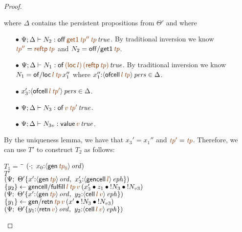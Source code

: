\begin{proof}
\begin{description}
where $\Delta$ contains the persistent propositions from $\Theta'$ and where
\begin{itemize}
\item[$\bullet$] $\Psi; \Delta \vdash N_2 : \isconc{{\sf off}\,\lf{{\sf get1}}\,\lf{{\it tp}''}\,\lf{{\it tp}}}$. By traditional inversion we know $\lf{{\it tp}''} = \lf{{\sf reftp}\,{\it tp}}$ and $N_2 = {{\sf off/get1}\,\lf{\it tp}}$. 
\item[$\bullet$] $\Psi; \Delta \vdash N_1 : \isconc{{\sf of}\,\lf{({\sf loc}\,l)}\,\lf{({\sf reftp}\,\lf{{\it tp}})}}$. By traditional inversion we know $N_1 = {\sf of/loc}\,\lf{l}\,\lf{{\it tp}}\,x_1''$ where $x_1''{:}\ispers{\susp{{\sf ofcell}\,\lf{l}\,\lf{{\it tp}}}} \in \Delta$.
\item[$\bullet$] $x_3'{:}\ispers{\susp{{\sf ofcell}\,\lf{l}\,\lf{{\it tp}'}}} \in \Delta$.
\item[$\bullet$] $\Psi; \Delta \vdash N_3 : \isconc{{\sf of}\,\lf{v}\,\lf{{\it tp}'}}$.
\item[$\bullet$] $\Psi; \Delta \vdash N_{3v} : \isconc{{\sf value}\,\lf{v}}$.
\end{itemize}
By the uniqueness lemma, we have that $x_3' = x_1''$ and $\lf{{\it
    tp}'} = \lf{{\it tp}}$. Therefore, we can use $T'$ to construct $T_2$
as follows:

\begin{tabbing}
$T_1 = ~$ \= \qquad \= 
    $(\cdot; ~ x_0{:}\istrue{\susp{{\sf gen}\,\lf{{\it tp}_0}}})$
\\
\>$T'$
\\
\>\> $\left(\Psi; ~
       \tackon{\Theta'}
       {x'{:}\istrue{\susp{{\sf gen}\,\lf{{\it tp}}}}, ~
        x_3'{:}\iseph{\susp{{\sf gencell}\,\lf{l}}}
       }\right)$
\\
\>$\trstep{y_2}{{\sf gencell/fulfill}\,\lf{l}\,\lf{{\it tp}}\,\lf{v}\,
      (\tfuser{x_3'}{\tfuser{z_1}{\tfuser{\tbangr{N_3}}{\tbangr{N_{v3}}}}})}$
\\
\>\> $\left(\Psi; ~
       \tackon{\Theta'}
       {x'{:}\istrue{\susp{{\sf gen}\,\lf{{\it tp}}}}, ~
        y_2{:}\iseph{\susp{{\sf cell}\,\lf{l}\,\lf{v}}}
       }\right)$
\\
\>$\trstep{y_1}{{\sf gen/retn}\,\lf{{\it tp}}\,\lf{v}\,
     (\tfuser{x'}{\tfuser{\tbangr{N_3}}{\tbangr{N_{v3}}}})}$
\\
\>\> $\left(\Psi; ~
       \tackon{\Theta'}
       {y_1{:}\istrue{\susp{{\sf retn}\,\lf{v}}}, ~
        y_2{:}\iseph{\susp{{\sf cell}\,\lf{l}\,\lf{v}}}
       }\right)$
\end{tabbing}


\end{description}
\end{proof}
